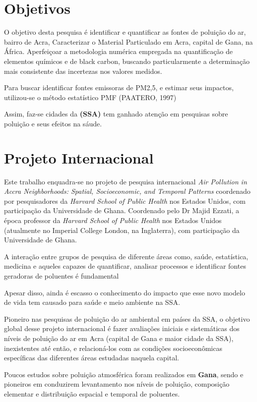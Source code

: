 \section{Objetivos}

O objetivo desta pesquisa é identificar e quantificar 
as fontes de poluição do ar, bairro de Acra,  
Caracterizar o Material Particulado em Acra, capital de Gana, na África.
Aperfeiçoar a metodologia numérica empregada na quantificação de elementos 
químicos e de black carbon, buscando particularmente a determinação mais
consistente das incertezas nos valores medidos.

Para buscar identificar fontes emissoras de PM2,5, e estimar seus impactos, utilizou-se o método estatístico PMF (PAATERO, 1997)



Assim, faz-se cidades da \textbf{(SSA)} tem ganhado atenção em pesquisas sobre 
poluição e seus efeitos na sáude. 

\section{Projeto Internacional}

Este trabalho enquadra-se no projeto de pesquisa internacional 
\textit{Air Pollution in Accra Neighborhoods: Spatial, Socioeconomic, and Temporal Patterns} 
coordenado por pesquisadores da \textit{Harvard School of Public Health} nos Estados Unidos, 
com participação da Universidade de Ghana. 
Coordenado pelo Dr Majid Ezzati, a época professor da \textit{Harvard School of Public Health} 
nos Estados Unidos (atualmente no Imperial College London, na Inglaterra), com participação 
da Universidade de Ghana. 

A interação entre grupos de pesquisa de diferente áreas como, saúde, estatística,
medicina e aqueles capazes de quantificar, analisar processos e 
identificar fontes geradoras de poluentes é fundamental

Apesar disso, ainda é escasso o conhecimento do impacto que esse novo modelo de vida 
tem causado para saúde e meio ambiente na SSA. 

Pioneiro nas pesquisas de poluição do ar ambiental em países da SSA, o objetivo 
global desse projeto internacional é fazer avaliações iniciais e sistemáticas 
dos níveis de poluição do ar em Acra (capital de Gana e maior cidade da SSA), 
inexistentes até então, e relacioná-los com as condições socioeconômicas 
específicas das diferentes áreas estudadas naquela capital.

Poucos estudos sobre poluição atmosférica foram realizados em \textbf{Gana}, 
sendo \citep{ARKU2008} e \citep{DIONISIO2010} pioneiros em conduzirem 
levantamento nos níveis de poluição, composição elementar e distribuição espacial 
e temporal de poluentes. 

